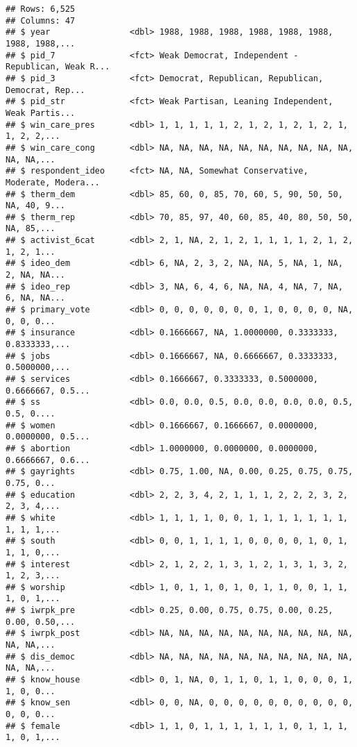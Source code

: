 \documentclass[
]{article}
\begin{document}
\begin{verbatim}
## Rows: 6,525
## Columns: 47
## $ year                <dbl> 1988, 1988, 1988, 1988, 1988, 1988, 1988, 1988,...
## $ pid_7               <fct> Weak Democrat, Independent - Republican, Weak R...
## $ pid_3               <fct> Democrat, Republican, Republican, Democrat, Rep...
## $ pid_str             <fct> Weak Partisan, Leaning Independent, Weak Partis...
## $ win_care_pres       <dbl> 1, 1, 1, 1, 1, 2, 1, 2, 1, 2, 1, 2, 1, 1, 2, 2,...
## $ win_care_cong       <dbl> NA, NA, NA, NA, NA, NA, NA, NA, NA, NA, NA, NA,...
## $ respondent_ideo     <fct> NA, NA, Somewhat Conservative, Moderate, Modera...
## $ therm_dem           <dbl> 85, 60, 0, 85, 70, 60, 5, 90, 50, 50, NA, 40, 9...
## $ therm_rep           <dbl> 70, 85, 97, 40, 60, 85, 40, 80, 50, 50, NA, 85,...
## $ activist_6cat       <dbl> 2, 1, NA, 2, 1, 2, 1, 1, 1, 1, 2, 1, 2, 1, 2, 1...
## $ ideo_dem            <dbl> 6, NA, 2, 3, 2, NA, NA, 5, NA, 1, NA, 2, NA, NA...
## $ ideo_rep            <dbl> 3, NA, 6, 4, 6, NA, NA, 4, NA, 7, NA, 6, NA, NA...
## $ primary_vote        <dbl> 0, 0, 0, 0, 0, 0, 0, 1, 0, 0, 0, 0, NA, 0, 0, 0...
## $ insurance           <dbl> 0.1666667, NA, 1.0000000, 0.3333333, 0.8333333,...
## $ jobs                <dbl> 0.1666667, NA, 0.6666667, 0.3333333, 0.5000000,...
## $ services            <dbl> 0.1666667, 0.3333333, 0.5000000, 0.6666667, 0.5...
## $ ss                  <dbl> 0.0, 0.0, 0.5, 0.0, 0.0, 0.0, 0.0, 0.5, 0.5, 0....
## $ women               <dbl> 0.1666667, 0.1666667, 0.0000000, 0.0000000, 0.5...
## $ abortion            <dbl> 1.0000000, 0.0000000, 0.0000000, 0.6666667, 0.6...
## $ gayrights           <dbl> 0.75, 1.00, NA, 0.00, 0.25, 0.75, 0.75, 0.75, 0...
## $ education           <dbl> 2, 2, 3, 4, 2, 1, 1, 1, 2, 2, 2, 3, 2, 2, 3, 4,...
## $ white               <dbl> 1, 1, 1, 1, 0, 0, 1, 1, 1, 1, 1, 1, 1, 1, 1, 1,...
## $ south               <dbl> 0, 0, 1, 1, 1, 1, 0, 0, 0, 0, 1, 0, 1, 1, 1, 0,...
## $ interest            <dbl> 2, 1, 2, 2, 1, 3, 1, 2, 1, 3, 1, 3, 2, 1, 2, 3,...
## $ worship             <dbl> 1, 0, 1, 1, 0, 1, 0, 1, 1, 0, 0, 1, 1, 1, 0, 1,...
## $ iwrpk_pre           <dbl> 0.25, 0.00, 0.75, 0.75, 0.00, 0.25, 0.00, 0.50,...
## $ iwrpk_post          <dbl> NA, NA, NA, NA, NA, NA, NA, NA, NA, NA, NA, NA,...
## $ dis_democ           <dbl> NA, NA, NA, NA, NA, NA, NA, NA, NA, NA, NA, NA,...
## $ know_house          <dbl> 0, 1, NA, 0, 1, 1, 0, 1, 1, 0, 0, 0, 1, 1, 0, 0...
## $ know_sen            <dbl> 0, 0, NA, 0, 0, 0, 0, 0, 0, 0, 0, 0, 0, 0, 0, 0...
## $ female              <dbl> 1, 1, 0, 1, 1, 1, 1, 1, 1, 0, 1, 1, 1, 1, 0, 1,...

\end{verbatim}
\end{document}
